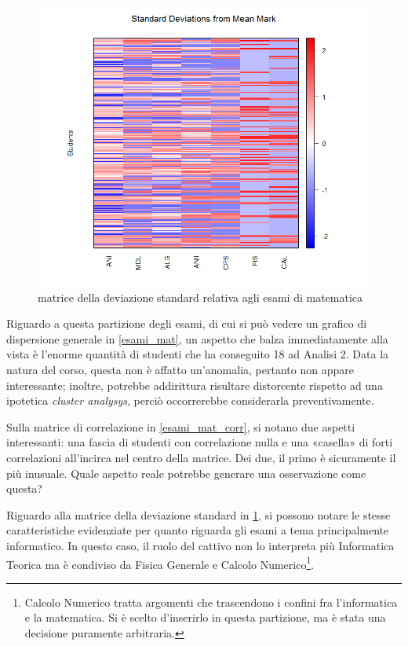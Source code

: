 \begin{figure}
    \centering
    \caption{matrice della deviazione standard relativa agli esami di matematica}
    \label{esami_mat_stddev}
	\includegraphics[scale=0.32]{img/std_dev_matrix_3.png}
\end{figure}

Riguardo a questa partizione degli esami, di cui si può vedere un grafico di dispersione generale in \ref{esami_mat}, un aspetto che balza immediatamente alla vista è l’enorme quantità di studenti che ha conseguito 18 ad Analisi 2. Data la natura del corso, questa non è affatto un'anomalia, pertanto non appare interessante; inoltre, potrebbe addirittura risultare distorcente rispetto ad una ipotetica \textit{cluster analysys}, perciò occorrerebbe considerarla preventivamente.

Sulla matrice di correlazione in \ref{esami_mat_corr}, si notano due aspetti interessanti: una fascia di studenti con correlazione nulla e una «casella» di forti correlazioni all’incirca nel centro della matrice. Dei due, il primo è sicuramente il più inusuale. Quale aspetto reale potrebbe generare una osservazione come questa?

Riguardo alla matrice della deviazione standard in \ref{esami_mat_stddev}, si possono notare le stesse caratteristiche evidenziate per quanto riguarda gli esami a tema principalmente informatico. In questo caso, il ruolo del cattivo non lo interpreta più Informatica Teorica ma è condiviso da Fisica Generale e Calcolo Numerico\footnote{Calcolo Numerico tratta argomenti che trascendono i confini fra l’informatica e la matematica. Si è scelto d'inserirlo in questa partizione, ma è stata una decisione puramente arbitraria.}.

